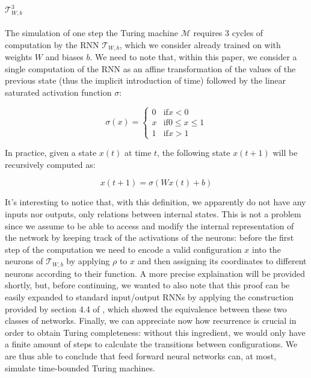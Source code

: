 \documentclass{article}
\begin{document}
\paragraph{$\mathcal{T}_{W,b}^3$} The simulation of one step the Turing machine $\mathcal{M}$ requires $3$ cycles of computation by the RNN $\mathcal{T}_{W,b}$, which we consider already trained on with weights $W$ and biases $b$. We need to note that, within this paper, we consider a single computation of the RNN as an affine transformation of the values of the previous state (thus the implicit introduction of time) followed by the linear saturated activation function $\sigma$:

    \begin{equation}
        \sigma(x)=
            \begin{cases}
                0 & \text{if} x < 0\\
                x & \text{if} 0 \leq x \leq 1\\
                1 & \text{if} x > 1
            \end{cases} 
    \end{equation}

In practice, given a state $x(t)$ at time $t$, the following state $x(t+1)$ will be recursively computed as:

    \begin{equation}\label{eq:rnnformula}
        x(t+1) = \sigma(Wx(t) + b)
    \end{equation}

It's interesting to notice that, with this definition, we apparently do not have any inputs nor outputs, only relations between internal states. This is not a problem since we assume to be able to access and modify the internal representation of the network by keeping track of the activations of the neurons: before the first step of the computation we need to encode a valid configuration $x$ into the neurons of $\mathcal{T}_{W,b}$ by applying $\rho$ to $x$ and then assigning its coordinates to different neurons according to their function. A more precise explaination will be provided shortly, but, before continuing, we wanted to also note that this proof can be easily expanded to standard input/output RNNs by applying the construction provided by section 4.4 of \cite{SIE95}, which showed the equivalence between these two classes of networks. Finally, we can appreciate now how recurrence is crucial in order to obtain Turing completeness: without this ingredient, we would only have a finite amount of steps to calculate the transitions between configurations. We are thus able to conclude that feed forward neural networks can, at most, simulate time-bounded Turing machines.
\end{document}
